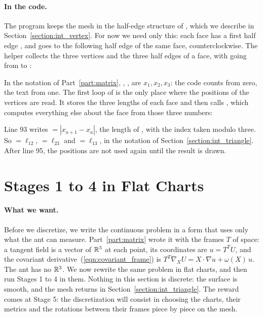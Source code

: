 \paragraph{In the code.} The program keeps the mesh in the half-edge structure of , which we describe in Section~\ref{section:int_vertex}. For now we need only this: each face has a first half edge , and  goes to the following half edge of the same face, counterclockwise. The helper  collects the three vertices and the three half edges of a face, with  going from  to :

In the notation of Part~\ref{part:matrix}, , ,  are $x_1, x_2, x_3$: the code counts from zero, the text from one. The first loop of  is the only place where the positions  of the vertices are read. It stores the three lengths of each face and then calls , which computes everything else about the face from those three numbers:

Line 93 writes  $= |x_{a+1} - x_a|$, the length of , with the index taken modulo three. So  $= \ell_{12}$,  $= \ell_{23}$ and  $= \ell_{13}$, in the notation of Section~\ref{section:int_triangle}. After line 95, the positions are not used again until the result is drawn.

\section{Stages 1 to 4 in Flat Charts}
\label{section:r3_continuous}

\paragraph{What we want.} Before we discretize, we write the continuous problem in a form that uses only what the ant can measure. Part~\ref{part:matrix} wrote it with the frames $T$ of space: a tangent field is a vector of $\mathbb{R}^3$ at each point, its coordinates are $u = T^TU$, and the covariant derivative~(\ref{eqn:covariant_frame}) is $T^T\nabla_XU = X\cdot\nabla u + \omega(X)\,u$. The ant has no $\mathbb{R}^3$. We now rewrite the same problem in flat charts, and then run Stages 1 to 4 in them. Nothing in this section is discrete: the surface is smooth, and the mesh returns in Section~\ref{section:int_triangle}. The reward comes at Stage 5: the discretization will consist in choosing the charts, their metrics and the rotations between their frames piece by piece on the mesh.

